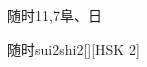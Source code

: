 \begin{entry}{随时}{11,7}{⾩、⽇}
  \begin{phonetics}{随时}{sui2shi2}[][HSK 2]
  \end{phonetics}
\end{entry}
